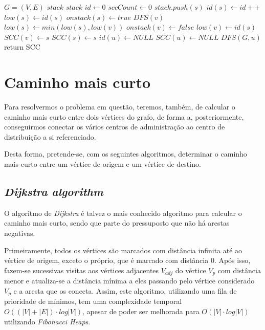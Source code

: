\documentclass[12pt,a4paper]{report}
\begin{document}
		\begin{center}
			\begin{algorithmic}[1]
				\State $G = (V, E)$
				\State $stack$ $stack$
				\State $id \leftarrow 0$
				\State $sccCount \leftarrow 0$
				\newline
					\State $stack.push(s)$
					\State $id(s) \leftarrow id++$
					\State $low(s) \leftarrow id(s)$
					\State $onstack(s) \leftarrow true$
							\State $DFS(v)$
						\EndIf
							\State $low(s) \leftarrow min(low(s), low(v))$
						\EndIf
					\EndFor
							\State $onstack(v) \leftarrow false$
							\State $low(v) \leftarrow id(s)$
							\State $SCC(v) \leftarrow s$
						\EndWhile
						\State $SCC(s) \leftarrow s$
					\EndIf
				\EndFunction
				\newline
					\State $id(u) \leftarrow NULL$
					\State $SCC(u) \leftarrow NULL$
				\EndFor
						\State $DFS(G,u)$
					\EndIf
				\EndFor
				\State return SCC
				\EndFunction
			\end{algorithmic}
		\end{center}


	\section{Caminho mais curto}
	\label{perspetivas:caminhomaiscurto}
	Para resolvermos o problema em questão, teremos, também, de calcular o caminho mais curto entre dois vértices do grafo, de forma a, posteriormente, conseguirmos conectar os vários centros de administração ao centro de distribuição a si referenciado. \par
	Desta forma, pretende-se, com os seguintes algoritmos, determinar o caminho mais curto entre um vértice de origem e um vértice de destino.

		\subsection{\textit{Dijkstra algorithm}}
		\label{algo:dijkstra}
		O algoritmo de \textit{Dijkstra} é talvez o mais conhecido algoritmo para calcular o caminho mais curto, sendo que parte do pressuposto que não há arestas negativas. \par
		Primeiramente, todos os vértices são marcados com distância infinita até ao vértice de origem, exceto o próprio, que é marcado com distância 0. Após isso, fazem-se sucessivas visitas aos vértices adjacentes \( V_{adj} \)  do vértice \(V_p\) com distância menor e atualiza-se a distância mínima a eles passando pelo vértice considerado \(V_p\) e a aresta que os conecta. Assim, este algoritmo, utilizando uma fila de prioridade de mínimos, tem uma complexidade temporal \(O((|V|+|E|)\cdot log|V|)\), apesar de poder ser melhorada para \(O(|V|\cdot log|V|)\) utilizando \textit{Fibonacci Heaps}.
\end{document}
